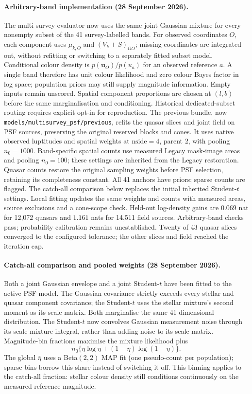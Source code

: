 \documentclass[11pt,a4paper]{article}
\newcommand{\uvec}{\mathbf{u}}
\begin{document}
\paragraph{Arbitrary-band implementation (28 September 2026).}
The multi-survey evaluator now uses the same joint Gaussian mixture for every
nonempty subset of the 41 survey-labelled bands. For observed coordinates $O$,
each component uses $\mu_{k,O}$ and $(V_k+S)_{OO}$; missing coordinates are
integrated out, without refitting or switching to a separately fitted subset
model. Conditional colour density is $p(\uvec_O)/p(u_a)$ for an observed
reference $a$. A single band therefore has unit colour likelihood and zero
colour Bayes factor in log space; population priors may still supply magnitude
information. Empty inputs remain unscored. Spatial component proportions are
chosen at $(l,b)$ before the same marginalisation and conditioning. Historical
dedicated-subset routing requires explicit opt-in for reproduction.
The previous bundle, now \texttt{models/multisurvey\_psf/previous}, refits the quasar
slices and joint field on PSF sources, preserving the original reserved blocks
and cones. It uses native observed luptitudes and spatial weights at
$\mathrm{nside}=4$, parent $2$, with pooling $n_0=1000$. Band-specific spatial
counts use measured Legacy mask-image areas and pooling $n_0=100$; these
settings are inherited from the Legacy restoration. Quasar counts restore the
original sampling weights before PSF selection, retaining its completeness
constant. All 41 anchors have priors; sparse counts are flagged. The
catch-all comparison below replaces the initial inherited Student-$t$
settings. Local fitting updates the same weights
and counts with measured areas, source exclusions and a cone-scope check.
Held-out log-density gains are $0.069$ nat for 12,072 quasars and $1.161$ nats
for 14,511 field sources. Arbitrary-band checks pass; probability calibration
remains unestablished. Twenty of 43 quasar slices converged to the configured
tolerance; the other slices and field reached the iteration cap.

\paragraph{Catch-all comparison and pooled weights (28 September 2026).}
Both a joint Gaussian envelope and a joint Student-$t$ have been fitted to
the active PSF model. The Gaussian covariance strictly exceeds every stellar
and quasar component covariance; the Student-$t$ uses the stellar mixture's
second moment as its scale matrix. Both marginalise the same 41-dimensional
distribution. The Student-$t$ now convolves Gaussian measurement noise through
its scale-mixture integral, rather than adding noise to its scale matrix.
Magnitude-bin fractions maximise the mixture likelihood plus
\[
 n_0\{\bar\eta\log\eta+(1-\bar\eta)\log(1-\eta)\}.
\]
The global $\bar\eta$ uses a Beta$(2,2)$ MAP fit (one pseudo-count per
population); sparse bins borrow this share instead of switching it off.
This binning applies to the catch-all fraction: stellar colour density still
conditions continuously on the measured reference magnitude.
\end{document}
